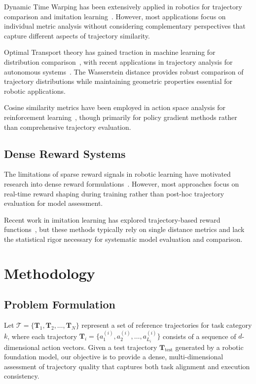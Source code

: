 \documentclass[10pt,twocolumn]{article}
\begin{document}
Dynamic Time Warping has been extensively applied in robotics for trajectory comparison and imitation learning~\cite{calinon2007learning, pervez2017learning}. However, most applications focus on individual metric analysis without considering complementary perspectives that capture different aspects of trajectory similarity.

Optimal Transport theory has gained traction in machine learning for distribution comparison~\cite{cuturi2013sinkhorn, peyre2019computational}, with recent applications in trajectory analysis for autonomous systems~\cite{chen2021learning}. The Wasserstein distance provides robust comparison of trajectory distributions while maintaining geometric properties essential for robotic applications.

Cosine similarity metrics have been employed in action space analysis for reinforcement learning~\cite{haarnoja2018soft}, though primarily for policy gradient methods rather than comprehensive trajectory evaluation.

\subsection{Dense Reward Systems}

The limitations of sparse reward signals in robotic learning have motivated research into dense reward formulations~\cite{ng1999policy, pathak2017curiosity}. However, most approaches focus on real-time reward shaping during training rather than post-hoc trajectory evaluation for model assessment.

Recent work in imitation learning has explored trajectory-based reward functions~\cite{ho2016generative, gail2016}, but these methods typically rely on single distance metrics and lack the statistical rigor necessary for systematic model evaluation and comparison.

\section{Methodology}

\subsection{Problem Formulation}

Let $\mathcal{T} = \{\mathbf{T}_1, \mathbf{T}_2, \ldots, \mathbf{T}_N\}$ represent a set of reference trajectories for task category $k$, where each trajectory $\mathbf{T}_i = \{a_1^{(i)}, a_2^{(i)}, \ldots, a_{L_i}^{(i)}\}$ consists of a sequence of $d$-dimensional action vectors. Given a test trajectory $\mathbf{T}_{\text{test}}$ generated by a robotic foundation model, our objective is to provide a dense, multi-dimensional assessment of trajectory quality that captures both task alignment and execution consistency.
\end{document}
